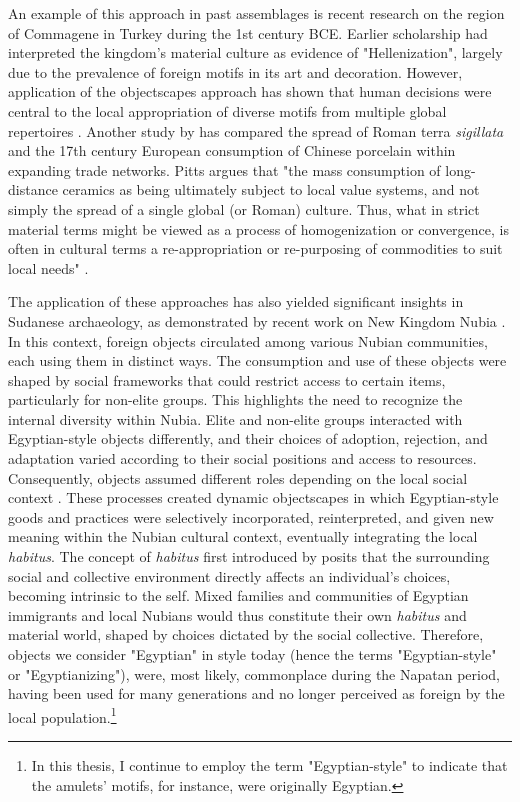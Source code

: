 An example of this approach in past assemblages is recent research on the region of Commagene in Turkey during the 1st century BCE. Earlier scholarship had interpreted the kingdom's material culture as evidence of "Hellenization", largely due to the prevalence of foreign motifs in its art and decoration. However, application of the objectscapes approach has shown that human decisions were central to the local appropriation of diverse motifs from multiple global repertoires \parencites[p.~375-379]{pittsObjectscapesManifestoInvestigating2021}. Another study by \textcite{pittsGlobalisationCirculationMass2014} has compared the spread of Roman terra \textit{sigillata} and the 17th century European consumption of Chinese porcelain within expanding trade networks. Pitts argues that "the mass consumption of long-distance ceramics as being ultimately subject to local value systems, and not simply the spread of a single global (or Roman) culture. Thus, what in strict material terms might be viewed as a process of homogenization or convergence, is often in cultural terms a re-appropriation or re-purposing of commodities to suit local needs" \parencites[p.~86]{pittsGlobalisationCirculationMass2014}.


The application of these approaches has also yielded significant insights in Sudanese archaeology, as demonstrated by recent work on New Kingdom Nubia \parencites{lemosForeignObjectsLocal2020, lemosAlternativesColonizationMarginal2021, lemosObjectMetamorphosisColonial2024}. In this context, foreign objects circulated among various Nubian communities, each using them in distinct ways. The consumption and use of these objects were shaped by social frameworks that could restrict access to certain items, particularly for non-elite groups. This highlights the need to recognize the internal diversity within Nubia. Elite and non-elite groups interacted with Egyptian-style objects differently, and their choices of adoption, rejection, and adaptation varied according to their social positions and access to resources. Consequently, objects assumed different roles depending on the local social context \parencites{lemosObjectMetamorphosisColonial2024, lemosCulturalEntanglementsExperiencing2024}. These processes created dynamic objectscapes in which Egyptian-style goods and practices were selectively incorporated, reinterpreted, and given new meaning within the Nubian cultural context, eventually integrating the local \textit{habitus}. The concept of \textit{habitus} first introduced by \textcites{bourdieuOutlineTheoryPractice1977} posits that the surrounding social and collective environment directly affects an individual's choices, becoming intrinsic to the self. Mixed families and communities of Egyptian immigrants and local Nubians would thus constitute their own \textit{habitus} and material world, shaped by choices dictated by the social collective. Therefore, objects we consider "Egyptian" in style today (hence the terms "Egyptian-style" or "Egyptianizing"), were, most likely, commonplace during the Napatan period, having been used for many generations and no longer perceived as foreign by the local population.\footnote{In this thesis, I continue to employ the term "Egyptian-style" to indicate that the amulets' motifs, for instance, were originally Egyptian.}


